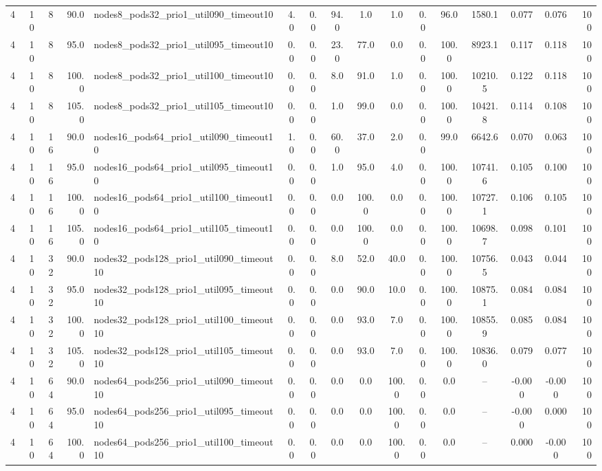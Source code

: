 \begin{tabular}{r r r r l c c c c c c c c c c r}
4 & 10 & 8 & 90.0 & nodes8\_pods32\_prio1\_util090\_timeout10 & 4.0 & 0.0 & 94.0 & 1.0 & 1.0 & 0.0 & 96.0 & 1580.1 & 0.077 & 0.076 & 100 \\
4 & 10 & 8 & 95.0 & nodes8\_pods32\_prio1\_util095\_timeout10 & 0.0 & 0.0 & 23.0 & 77.0 & 0.0 & 0.0 & 100.0 & 8923.1 & 0.117 & 0.118 & 100 \\
4 & 10 & 8 & 100.0 & nodes8\_pods32\_prio1\_util100\_timeout10 & 0.0 & 0.0 & 8.0 & 91.0 & 1.0 & 0.0 & 100.0 & 10210.5 & 0.122 & 0.118 & 100 \\
4 & 10 & 8 & 105.0 & nodes8\_pods32\_prio1\_util105\_timeout10 & 0.0 & 0.0 & 1.0 & 99.0 & 0.0 & 0.0 & 100.0 & 10421.8 & 0.114 & 0.108 & 100 \\
4 & 10 & 16 & 90.0 & nodes16\_pods64\_prio1\_util090\_timeout10 & 1.0 & 0.0 & 60.0 & 37.0 & 2.0 & 0.0 & 99.0 & 6642.6 & 0.070 & 0.063 & 100 \\
4 & 10 & 16 & 95.0 & nodes16\_pods64\_prio1\_util095\_timeout10 & 0.0 & 0.0 & 1.0 & 95.0 & 4.0 & 0.0 & 100.0 & 10741.6 & 0.105 & 0.100 & 100 \\
4 & 10 & 16 & 100.0 & nodes16\_pods64\_prio1\_util100\_timeout10 & 0.0 & 0.0 & 0.0 & 100.0 & 0.0 & 0.0 & 100.0 & 10727.1 & 0.106 & 0.105 & 100 \\
4 & 10 & 16 & 105.0 & nodes16\_pods64\_prio1\_util105\_timeout10 & 0.0 & 0.0 & 0.0 & 100.0 & 0.0 & 0.0 & 100.0 & 10698.7 & 0.098 & 0.101 & 100 \\
4 & 10 & 32 & 90.0 & nodes32\_pods128\_prio1\_util090\_timeout10 & 0.0 & 0.0 & 8.0 & 52.0 & 40.0 & 0.0 & 100.0 & 10756.5 & 0.043 & 0.044 & 100 \\
4 & 10 & 32 & 95.0 & nodes32\_pods128\_prio1\_util095\_timeout10 & 0.0 & 0.0 & 0.0 & 90.0 & 10.0 & 0.0 & 100.0 & 10875.1 & 0.084 & 0.084 & 100 \\
4 & 10 & 32 & 100.0 & nodes32\_pods128\_prio1\_util100\_timeout10 & 0.0 & 0.0 & 0.0 & 93.0 & 7.0 & 0.0 & 100.0 & 10855.9 & 0.085 & 0.084 & 100 \\
4 & 10 & 32 & 105.0 & nodes32\_pods128\_prio1\_util105\_timeout10 & 0.0 & 0.0 & 0.0 & 93.0 & 7.0 & 0.0 & 100.0 & 10836.0 & 0.079 & 0.077 & 100 \\
4 & 10 & 64 & 90.0 & nodes64\_pods256\_prio1\_util090\_timeout10 & 0.0 & 0.0 & 0.0 & 0.0 & 100.0 & 0.0 & 0.0 & -- & -0.000 & -0.000 & 100 \\
4 & 10 & 64 & 95.0 & nodes64\_pods256\_prio1\_util095\_timeout10 & 0.0 & 0.0 & 0.0 & 0.0 & 100.0 & 0.0 & 0.0 & -- & -0.000 & 0.000 & 100 \\
4 & 10 & 64 & 100.0 & nodes64\_pods256\_prio1\_util100\_timeout10 & 0.0 & 0.0 & 0.0 & 0.0 & 100.0 & 0.0 & 0.0 & -- & 0.000 & -0.000 & 100 \\

\end{tabular}
